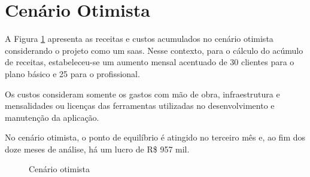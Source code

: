 \section{Cenário Otimista}

A Figura \ref{fig:cenario-otimista} apresenta as receitas e custos acumulados no cenário otimista considerando o projeto como um \gls{saas}. Nesse contexto, para o cálculo do acúmulo de receitas, estabeleceu-se um aumento mensal acentuado de 30 clientes para o plano básico e 25 para o profissional.

Os custos consideram somente os gastos com mão de obra, infraestrutura e mensalidades ou licenças das ferramentas utilizadas no desenvolvimento e manutenção da aplicação.

No cenário otimista, o ponto de equilíbrio é atingido no terceiro mês e, ao fim dos doze meses de análise, há um lucro de R\$ 957 mil.

\begin{figure}[h]
	\centering
	\caption{Cenário otimista}
	\label{fig:cenario-otimista}
\end{figure}